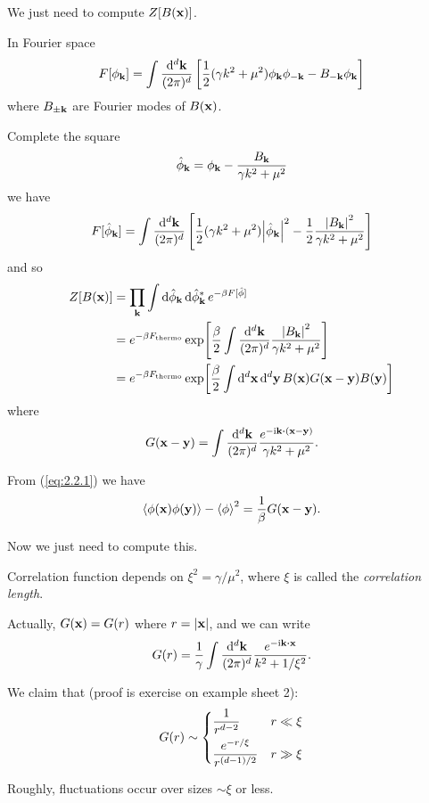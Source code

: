 \documentclass[a4paper,11pt]{article}
\begin{document}
	We just need to compute $Z[B(\vb x)]$. 

	In Fourier space
	\[
		F[\phi _{\vb k}] = \int \frac{\dd[d]{\vb k}}{(2 \pi)^d} \left[ \frac{1}{2} (\gamma k^2 + \mu^2)\phi _{\vb k} \phi _{-\vb k} - B _{-\vb k} \phi _{\vb k} \right]
	\]
	where $B _{\pm \vb k}$ are Fourier modes of $B(\vb x)$.

	Complete the square
	\[
		\hat \phi _{\vb k} = \phi _{\vb k} - \frac{B _{\vb k}}{\gamma k^2 + \mu^2}
	\]
	we have
	\[
		F[\hat \phi _{\vb k}] = \int \frac{\dd[d]{\vb k}}{(2\pi)^d} \left[ \frac{1}{2}(\gamma k^2 + \mu^2) \abs{\hat \phi _{\vb k}}^2 - \frac{1}{2} \frac{\abs{B _{\vb k}}^2}{\gamma k^2 + \mu^2}\right]
	\]
	and so
	\begin{align*}
		Z[B(\vb x)] &= \prod _{\vb k} \int \dd{\hat \phi _{\vb k}} \dd{\hat \phi _{\vb k}^*} e ^{-\beta F[\hat \phi]}\\
		& = e ^{- \beta F _{\text{thermo}}} \exp[\frac{\beta}{2} \int \frac{\dd[d]{\vb k}}{(2 \pi)^d} \frac{\abs{B _{\vb k}}^2}{\gamma k^2 + \mu^2}]\\
		& = e ^{-\beta F _{\text{thermo}}} \exp[\frac{\beta}{2} \int \dd[d]{\vb x} \dd[d]{\vb y} B(\vb x) G(\vb x - \vb y) B(\vb y)]
	\end{align*}
	where
	\[
		G(\vb x - \vb y) = \int \frac{\dd[d]{\vb k}}{(2\pi)^d} \frac{e ^{- \mathrm{i} \vb k \vdot (\vb x - \vb y)}}{\gamma k^2 + \mu^2}.
	\]
	
	From (\ref{eq:2.2.1}) we have
	\[
		\expval{\phi(\vb x)\phi(\vb y)} - \expval{\phi}^2 = \frac{1}{\beta} G(\vb x - \vb y).
	\]
	
	Now we just need to compute this.

	Correlation function depends on $\xi^2 = \gamma / \mu^2$, where $\xi$ is called the \emph{correlation length}.

	Actually, $G(\vb x) = G(r)$ where $r = \abs{\vb x}$, and we can write
	\[
		G(r) = \frac{1}{\gamma}\int \frac{\dd[d]{\vb k}}{(2\pi)^d} \frac{e ^{-\mathrm{i} \vb k \vdot \vb x}}{k^2 + 1 / \xi^2}.
	\]
	
	We claim that (proof is exercise on example sheet 2):
	\[
		G(r) \sim \begin{dcases}
			\frac{1}{r ^{d-2}} & r \ll \xi\\
			\frac{e ^{- r/ \xi}}{r ^{(d-1)/2}} & r \gg \xi
		\end{dcases}
	\]
	

	Roughly, fluctuations occur over sizes $\sim \xi$ or less.
\end{document}

